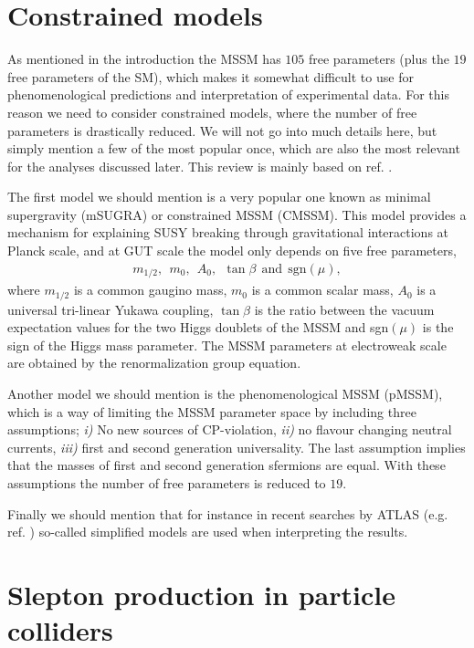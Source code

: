 \documentclass[twocolumn,a4paper,10pt]{article}
\begin{document}
\section{Constrained models}

As mentioned in the introduction the MSSM has $105$ free parameters (plus the $19$ free parameters 
of the SM), which makes it somewhat difficult to use for phenomenological predictions and interpretation 
of experimental data. For this reason we need to consider constrained models, where the number of 
free parameters is drastically reduced. We will not go into much details here, but simply mention a 
few of the most popular once, which are also the most relevant for the analyses discussed later.  
This review is mainly based on ref. \cite{Simplified models}. 

The first model we should mention is a very popular one known as minimal supergravity (mSUGRA) or 
constrained MSSM (CMSSM). This model provides a mechanism for explaining SUSY breaking through 
gravitational interactions at Planck scale, and at GUT scale the model only depends on five free 
parameters,  
\begin{align*}
m_{1/2},\:\: m_0, \:\: A_0, \:\: \tan\beta \:\:\text{and}\:\: \text{sgn}(\mu), 
\end{align*}
where $m_{1/2}$ is a common gaugino mass, $m_0$ is a common scalar mass, $A_0$ is a universal tri-linear 
Yukawa coupling, $\tan\beta$ is the ratio between the vacuum expectation values for the two Higgs 
doublets of the MSSM and sgn$(\mu)$ is the sign of the Higgs mass parameter. The MSSM parameters at 
electroweak scale are obtained by the renormalization group equation.      

Another model we should mention is the phenomenological MSSM (pMSSM), which is a way of limiting the 
MSSM parameter space by including three assumptions; \textit{i)} No new sources of CP-violation, 
\textit{ii)} no flavour changing neutral currents, \textit{iii)} first and second generation universality. 
The last assumption implies that the masses of first and second generation sfermions are equal. With 
these assumptions the number of free parameters is reduced to $19$.  

Finally we should mention that for instance in recent searches by ATLAS (e.g. ref. \cite{ATLAS:2017}) 
so-called simplified models are used when interpreting the results. 

\section{Slepton production in particle colliders}
\end{document}
